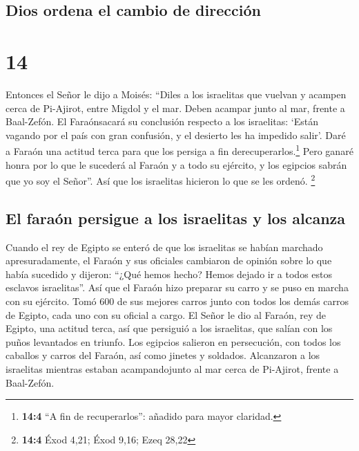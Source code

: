 \hypertarget{dios-ordena-el-cambio-de-direcciuxf3n}{%
\subsection{Dios ordena el cambio de
dirección}\label{dios-ordena-el-cambio-de-direcciuxf3n}}

\hypertarget{section-13}{%
\section{14}\label{section-13}}

 Entonces el Señor le dijo a Moisés: 
``Diles a los israelitas que vuelvan y acampen cerca de Pi-Ajirot, entre
Migdol y el mar. Deben acampar junto al mar, frente a Baal-Zefón.
 El Faraónsacará su conclusión respecto a los israelitas:
`Están vagando por el país con gran confusión, y el desierto les ha
impedido salir'.  Daré a Faraón una actitud terca para que
los persiga a fin derecuperarlos.\footnote{\textbf{14:4} ``A fin de
  recuperarlos'': añadido para mayor claridad.} Pero ganaré honra por lo
que le sucederá al Faraón y a todo su ejército, y los egipcios sabrán
que yo soy el Señor''. Así que los israelitas hicieron lo que se les
ordenó. \footnote{\textbf{14:4} Éxod 4,21; Éxod 9,16; Ezeq 28,22}

\hypertarget{el-farauxf3n-persigue-a-los-israelitas-y-los-alcanza}{%
\subsection{El faraón persigue a los israelitas y los
alcanza}\label{el-farauxf3n-persigue-a-los-israelitas-y-los-alcanza}}

 Cuando el rey de Egipto se enteró de que los israelitas
se habían marchado apresuradamente, el Faraón y sus oficiales cambiaron
de opinión sobre lo que había sucedido y dijeron: ``¿Qué hemos hecho?
Hemos dejado ir a todos estos esclavos israelitas''.  Así
que el Faraón hizo preparar su carro y se puso en marcha con su
ejército.  Tomó 600 de sus mejores carros junto con todos
los demás carros de Egipto, cada uno con su oficial a cargo.
 El Señor le dio al Faraón, rey de Egipto, una actitud
terca, así que persiguió a los israelitas, que salían con los puños
levantados en triunfo.  Los egipcios salieron en
persecución, con todos los caballos y carros del Faraón, así como
jinetes y soldados. Alcanzaron a los israelitas mientras estaban
acampandojunto al mar cerca de Pi-Ajirot, frente a Baal-Zefón.

